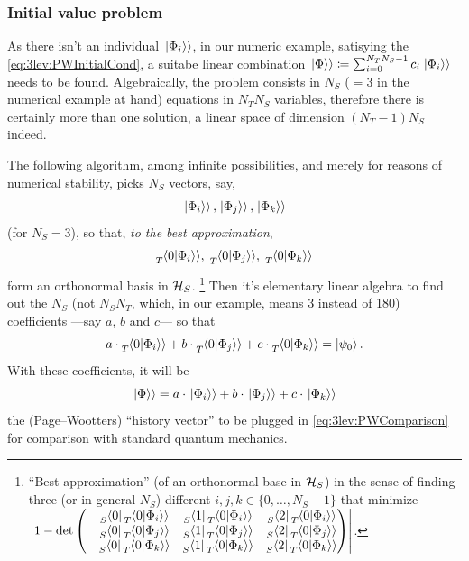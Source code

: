 \subsubsection*{Initial value problem}

As there isn't an individual $\left.\left| \Phi_i \right\rangle\right\rangle$,
in our numeric example,
satisying the \eqref{eq:3lev:PWInitialCond},
a suitabe linear combination
$\left.\left| \Phi \right\rangle\right\rangle \coloneqq \sum_{i=0}^{N_{T}N_{S}-1} c_{i}\left.\left| \Phi_i \right\rangle\right\rangle$
needs to be found. Algebraically, the problem consists in
$N_{S}$ ($=3$ in the numerical example at hand) equations
in $N_{T}N_{S}$ variables, therefore there is certainly more than one solution,
a linear space of dimension $(N_{T} - 1)N_{S}$ indeed.

The following algorithm, among infinite possibilities,
and merely for reasons of numerical stability,
picks $N_S$
vectors, say,
\[
  \left.\left| \Phi_i \right\rangle\right\rangle, \left.\left| \Phi_j \right\rangle\right\rangle, \left.\left| \Phi_k \right\rangle\right\rangle
\]
(for $N_S = 3$),
so that, \emph{to the best approximation},
\[
  \prescript{}{T}{\!\left.\left\langle 0 \middle| \Phi_i \right\rangle\right\rangle}, \;
  \prescript{}{T}{\!\left.\left\langle 0 \middle| \Phi_j \right\rangle\right\rangle}, \;
  \prescript{}{T}{\!\left.\left\langle 0 \middle| \Phi_k \right\rangle\right\rangle}
\]
form an orthonormal basis in $\mathcal{H}_S$.%
\footnote{
  ``Best approximation'' (of an orthonormal base in $\mathcal{H}_S$)
  in the sense of finding
  three (or in general $N_S$) different
  $i, j, k \in \{0, \dots, N_{S}-1\}$ that minimize
  $
    \abs{1 - \det\mqty(
      & \prescript{}{S}{\bra{0}}   \prescript{}{T}{\bradket{0}{\Phi_i}}
      & \prescript{}{S}{\bra{1}}   \prescript{}{T}{\bradket{0}{\Phi_i}}
      & \prescript{}{S}{\bra{2}}   \prescript{}{T}{\bradket{0}{\Phi_i}}
      \\
      & \prescript{}{S}{\bra{0}}   \prescript{}{T}{\bradket{0}{\Phi_j}}
      & \prescript{}{S}{\bra{1}}   \prescript{}{T}{\bradket{0}{\Phi_j}}
      & \prescript{}{S}{\bra{2}}   \prescript{}{T}{\bradket{0}{\Phi_j}}
      \\
      & \prescript{}{S}{\bra{0}}   \prescript{}{T}{\bradket{0}{\Phi_k}}
      & \prescript{}{S}{\bra{1}}   \prescript{}{T}{\bradket{0}{\Phi_k}}
      & \prescript{}{S}{\bra{2}}   \prescript{}{T}{\bradket{0}{\Phi_k}}
    )}
  $.
}
Then it's elementary linear algebra to find out the $N_S$ (not $N_S N_T$,
which, in our example, means 3 instead of 180) coefficients ---say $a$, $b$ and $c$---
so that \begin{equation}\label{eq:3lev:initialLinEq}
  a\cdot\prescript{}{T}{\!\left.\left\langle 0 \middle| \Phi_i \right\rangle\right\rangle} +
  b\cdot\prescript{}{T}{\!\left.\left\langle 0 \middle| \Phi_j \right\rangle\right\rangle} +
  c\cdot\prescript{}{T}{\!\left.\left\langle 0 \middle| \Phi_k \right\rangle\right\rangle} =
  \ket{\psi_0} .
\end{equation}
With these coefficients, it will be
\begin{equation}\label{eq:3lev:PhiLinearComb}
  \left.\left| \Phi \right\rangle\right\rangle =
  a\cdot\left.\left| \Phi_i \right\rangle\right\rangle +
  b\cdot\left.\left| \Phi_j \right\rangle\right\rangle +
  c\cdot\left.\left| \Phi_k \right\rangle\right\rangle
\end{equation}
the (Page--Wootters) ``history vector'' to be plugged in \eqref{eq:3lev:PWComparison}
for comparison with standard quantum mechanics.

